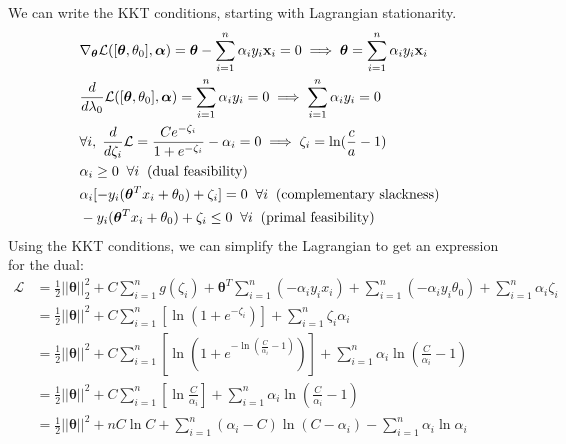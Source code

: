 \documentclass[11pt]{article}
\newcommand{\T}{\bm{\theta}}
\newcommand{\A}{\bm{\alpha}}
\begin{document}
\begin{enumerate}
\begin{itemize}
We can write the KKT conditions, starting with Lagrangian stationarity.
\begin{align*}
&\nabla_{\T}\mathcal{L}([\T,\theta_0],\A) = \T - \sum_{i=1}^n \alpha_iy_i{\bf x}_i =0 \implies \T = \sum_{i=1}^n\alpha_iy_i{\bf x}_i\\
&\frac{d}{d\lambda_0}\mathcal{L}([\T,\theta_0],\A) = \sum_{i=1}^n\alpha_iy_i = 0 \implies \sum_{i=1}^n\alpha_iy_i = 0\\
&\forall i, \; \frac{d}{d \zeta_i} \mathcal{L} = \frac{Ce^{-\zeta_i}}{1+e^{-\zeta_i}} - \alpha_i = 0 \implies \zeta_i = \text{ln}(\frac{c}{a} - 1)\\
&\alpha_i \geq 0 \; \; \forall i  \; \; \text{(dual feasibility)}\\
&\alpha_i[-y_i(\T^Tx_i + \theta_0) + \zeta_i] = 0 \; \; \forall i  \; \; \text{(complementary slackness)}\\
&-y_i(\T^Tx_i + \theta_0) + \zeta_i \leq 0 \; \; \forall i  \; \; \text{(primal feasibility)}\\
\end{align*}
Using the KKT conditions, we can simplify the Lagrangian to get an expression for the dual:
\begin{align*}
\mathcal{L} &= \frac{1}{2}||\T||_2^2 + C\sum_{i=1}^ng(\zeta_i) + \T^T\sum_{i=1}^n(-\alpha_iy_ix_i) + \sum_{i=1}^n(-\alpha_iy_i\theta_0) + \sum_{i=1}^n\alpha_i\zeta_i\\
&= \frac{1}{2}||\T||^2 + C\sum_{i=1}^n\left[\ln \left( 1 + e^{-\zeta_i} \right) \right] + \sum_{i=1}^n\zeta_i\alpha_i\\
&= \frac{1}{2}||\T||^2 + C\sum_{i=1}^n\left[\ln \left( 1 + e^{-\ln\left(\frac{C}{\alpha_i} - 1\right)} \right) \right] + \sum_{i=1}^n\alpha_i \ln \left( \frac{C}{\alpha_i} -1 \right)\\
&= \frac{1}{2}||\T||^2 + C\sum_{i=1}^n\left[ \ln \frac{C}{\alpha_i} \right] + \sum_{i=1}^n\alpha_i \ln \left( \frac{C}{\alpha_i} -1 \right)\\
&= \frac{1}{2}||\T||^2 + nC \ln C+ \sum_{i=1}^n(\alpha_i - C) \ln (C - \alpha_i) - \sum_{i=1}^n\alpha_i \ln \alpha_i\\
\end{align*}


\end{itemize}
\end{enumerate}
\end{document}

